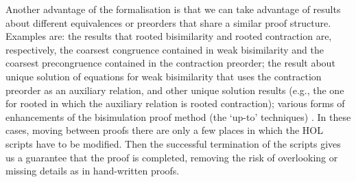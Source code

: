 
Another advantage of the formalisation is 
that we can take advantage of results about different 
equivalences or preorders that share a similar  proof structure. 
Examples are: the results that rooted bisimilarity and rooted contraction are,
respectively, the coarsest congruence contained in weak bisimilarity 
and the coarsest precongruence contained in the contraction  preorder; 
the result about unique solution of equations for weak bisimilarity that uses the
contraction preorder as an auxiliary relation, and other unique solution results (e.g., 
the one for rooted in which
the auxiliary relation is rooted contraction); various forms of enhancements of the bisimulation
proof method (the `up-to' techniques) \cite{Mil89,sangiorgi1992problem}.
In these cases,  moving between proofs there are only a few places in
which the HOL scripts have to be modified.
Then the successful termination of the scripts  gives us a guarantee that the proof is
completed,  removing the risk 
of overlooking or missing details as in hand-written proofs.



